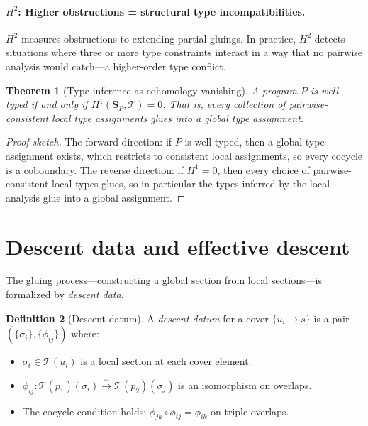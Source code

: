 \documentclass[11pt]{report}
\theoremstyle{definition}
\newtheorem{definition}{Definition}[section]
\theoremstyle{plain}
\newtheorem{theorem}[definition]{Theorem}
\begin{document}
\paragraph{$H^2$: Higher obstructions = structural type incompatibilities.}
$H^2$ measures obstructions to extending partial gluings. In practice, $H^2$
detects situations where three or more type constraints interact in a way
that no pairwise analysis would catch---a higher-order type conflict.

\begin{theorem}[Type inference as cohomology vanishing]
A program $P$ is well-typed if and only if $H^1(\mathbf{S}_P, \mathcal{T}) = 0$.
That is, every collection of pairwise-consistent local type assignments glues
into a global type assignment.
\end{theorem}

\begin{proof}[Proof sketch]
The forward direction: if $P$ is well-typed, then a global type assignment
exists, which restricts to consistent local assignments, so every cocycle is
a coboundary. The reverse direction: if $H^1 = 0$, then every choice of
pairwise-consistent local types glues, so in particular the types inferred by
the local analysis glue into a global assignment.
\end{proof}

\section{Descent data and effective descent}

The gluing process---constructing a global section from local sections---is
formalized by \emph{descent data}.

\begin{definition}[Descent datum]
A \emph{descent datum} for a cover $\{u_i \to s\}$ is a pair
$(\{\sigma_i\}, \{\phi_{ij}\})$ where:
\begin{itemize}[nosep]
  \item $\sigma_i \in \mathcal{T}(u_i)$ is a local section at each cover
        element.
  \item $\phi_{ij} : \mathcal{T}(p_1)(\sigma_i) \xrightarrow{\sim}
        \mathcal{T}(p_2)(\sigma_j)$ is an isomorphism on overlaps.
  \item The cocycle condition holds: $\phi_{jk} \circ \phi_{ij} = \phi_{ik}$
        on triple overlaps.
\end{itemize}
\end{definition}
\end{document}
